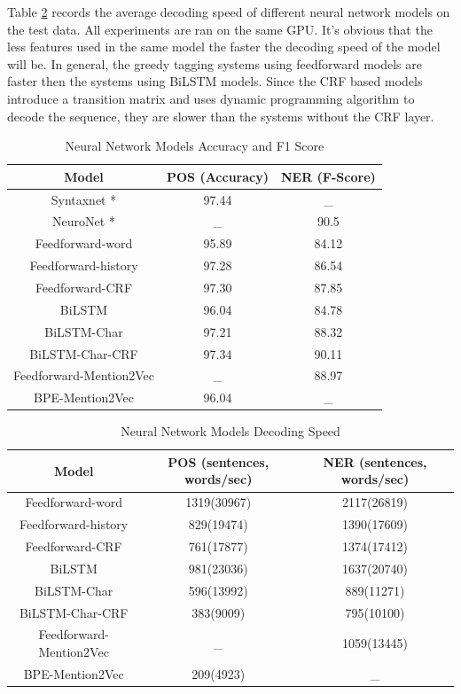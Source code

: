 \documentclass{sfuthesis}
\begin{document}
Table \ref{table:my-label2} records the average decoding speed of different neural network models on the test data. All experiments are ran on the same GPU. It's obvious that the less features used in the same model the faster the decoding speed of the model will be. In general, the greedy tagging systems using feedforward models are faster then the systems using BiLSTM models. Since the CRF based models introduce a transition matrix and uses dynamic programming algorithm to decode the sequence, they are slower than the systems without the CRF layer.

\begin{table}[]
\centering
\caption{Neural Network Models Accuracy and F1 Score}
\label{table:my-label1}
\begin{tabular}{|c|c|c|}
\hline
Model         & POS (Accuracy)  & NER (F-Score)       \\ \hline
Syntaxnet \**    & 97.44         &   _     \\ \hline
NeuroNet \**    & _    & 90.5                \\ \hline 
Feedforward-word    & 95.89          &   84.12     \\ \hline
Feedforward-history & 97.28     & 86.54        \\ \hline
Feedforward-CRF     & 97.30          &   87.85     \\ \hline
BiLSTM  & 96.04     & 84.78                             \\ \hline
BiLSTM-Char & 97.21 & 88.32             \\ \hline
BiLSTM-Char-CRF & 97.34  & 90.11             \\ \hline
Feedforward-Mention2Vec  & _    & 88.97                       \\ \hline
BPE-Mention2Vec & 96.04     &  _   \\ \hline   
\end{tabular}
\end{table}

\begin{table}[]
\centering
\caption{Neural Network Models Decoding Speed}
\label{table:my-label2}
\begin{tabular}{|c|c|c|}
\hline
Model       & POS  (sentences, words/sec)  & NER  (sentences, words/sec)      \\ \hline
Feedforward-word    & 1319(30967)     & 2117(26819)    \\ \hline
Feedforward-history & 829(19474)     & 1390(17609)     \\ \hline
Feedforward-CRF     & 761(17877)     & 1374(17412)     \\ \hline
BiLSTM             &981(23036)     & 1637(20740)       \\ \hline
BiLSTM-Char        & 596(13992)  & 889(11271)           \\ \hline
BiLSTM-Char-CRF    & 383(9009)  & 795(10100)         \\ \hline
Feedforward-Mention2Vec         & _      & 1059(13445)              \\ \hline
BPE-Mention2Vec     & 209(4923)  &  _               \\ \hline   
\end{tabular}
\end{table}
\end{document}
